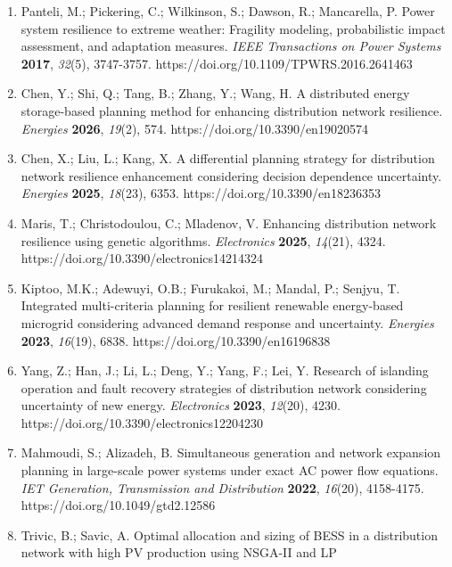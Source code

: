 \documentclass[
  10pt,
  a4paper,
]{article}
\begin{document}
\begin{enumerate}
  Bhusal, N.; Abdelmalak, M.; Kamruzzaman, M.; Benidris, M. Power system
  resilience: Current practices, challenges, and future directions.
  \emph{IEEE Access} \textbf{2020}, \emph{8}, 18064-18086.
  https://doi.org/10.1109/ACCESS.2020.2968586
\item
  Panteli, M.; Pickering, C.; Wilkinson, S.; Dawson, R.; Mancarella, P.
  Power system resilience to extreme weather: Fragility modeling,
  probabilistic impact assessment, and adaptation measures. \emph{IEEE
  Transactions on Power Systems} \textbf{2017}, \emph{32}(5), 3747-3757.
  https://doi.org/10.1109/TPWRS.2016.2641463
\item
  Chen, Y.; Shi, Q.; Tang, B.; Zhang, Y.; Wang, H. A distributed energy
  storage-based planning method for enhancing distribution network
  resilience. \emph{Energies} \textbf{2026}, \emph{19}(2), 574.
  https://doi.org/10.3390/en19020574
\item
  Chen, X.; Liu, L.; Kang, X. A differential planning strategy for
  distribution network resilience enhancement considering decision
  dependence uncertainty. \emph{Energies} \textbf{2025}, \emph{18}(23),
  6353. https://doi.org/10.3390/en18236353
\item
  Maris, T.; Christodoulou, C.; Mladenov, V. Enhancing distribution
  network resilience using genetic algorithms. \emph{Electronics}
  \textbf{2025}, \emph{14}(21), 4324.
  https://doi.org/10.3390/electronics14214324
\item
  Kiptoo, M.K.; Adewuyi, O.B.; Furukakoi, M.; Mandal, P.; Senjyu, T.
  Integrated multi-criteria planning for resilient renewable
  energy-based microgrid considering advanced demand response and
  uncertainty. \emph{Energies} \textbf{2023}, \emph{16}(19), 6838.
  https://doi.org/10.3390/en16196838
\item
  Yang, Z.; Han, J.; Li, L.; Deng, Y.; Yang, F.; Lei, Y. Research of
  islanding operation and fault recovery strategies of distribution
  network considering uncertainty of new energy. \emph{Electronics}
  \textbf{2023}, \emph{12}(20), 4230.
  https://doi.org/10.3390/electronics12204230
\item
  Mahmoudi, S.; Alizadeh, B. Simultaneous generation and network
  expansion planning in large-scale power systems under exact AC power
  flow equations. \emph{IET Generation, Transmission and Distribution}
  \textbf{2022}, \emph{16}(20), 4158-4175.
  https://doi.org/10.1049/gtd2.12586
\item
  Trivic, B.; Savic, A. Optimal allocation and sizing of BESS in a
  distribution network with high PV production using NSGA-II and LP

\end{enumerate}
\end{document}
